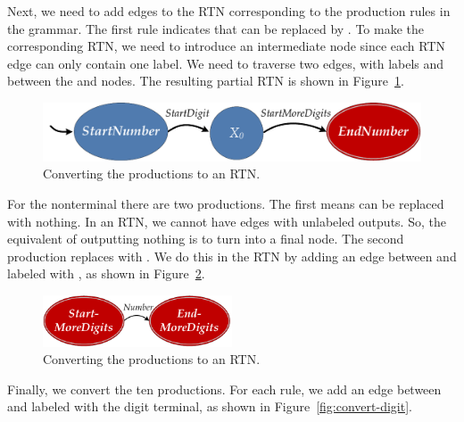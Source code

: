 {Next, we need to add edges to the RTN corresponding to the production rules in the grammar.  The first rule indicates that  can be replaced by  .  To make the corresponding RTN, we need to introduce an intermediate node since each RTN edge can only contain one label.  We need to traverse two edges, with labels  and  between the  and  nodes.  The resulting partial RTN is shown in Figure~\ref{fig:convert-number}.

\begin{figure}[htbp]
\begin{center}
\includegraphics[width=4.5in]{figures/convert-rtn-number.pdf}
\end{center}
\caption{Converting the  productions to an RTN.\label{fig:convert-number}}
\end{figure}

For the  nonterminal there are two productions.  The first means  can be replaced with nothing.  In an RTN, we cannot have edges with unlabeled outputs.  So, the equivalent of outputting nothing is to turn  into a final node.  The second production replaces  with .  We do this in the RTN by adding an edge between  and  labeled with , as shown in Figure~\ref{fig:convert-moredigits}.

\begin{figure}[!htbp]
\begin{center}
\includegraphics[height=0.6in]{figures/convert-rtn-moredigits.pdf}
\end{center}
\caption{Converting the  productions to an RTN.}\label{fig:convert-moredigits}
\end{figure}

Finally, we convert the ten  productions.  For each rule, we add an edge between  and  labeled with the digit terminal, as shown in Figure~\ref{fig:convert-digit}.

}
